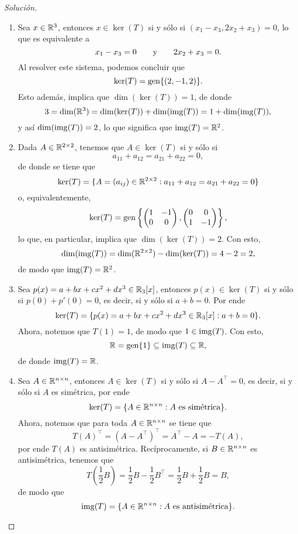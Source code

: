\documentclass[a4,11pt]{aleph-notas}
\begin{document}
\begin{proof}[Solución]\hspace{0pt}
\begin{enumerate}
    \item Sea $x\in\mathbb{R}^3$, entonces $x\in\ker(T)$ si y sólo si $(x_1-x_3,2x_2+x_3) = 0$, lo que es equivalente a 
    \[
        x_1 - x_3 = 0 \qquad\text{y}\qquad 2x_2 + x_3 = 0.
    \]
    Al resolver este sistema, podemos concluir que
    \[
        \ker(T) = \operatorname{gen}\{(2,-1,2)\}.
    \]
    Esto además, implica que $\dim(\ker(T)) = 1$, de donde
    \[
        3 = \dim(\mathbb{R}^3) = \dim(\ker(T)) + \dim(\operatorname{img}(T)) = 1 + \dim(\operatorname{img}(T)),
    \]
    y así $\dim(\operatorname{img}(T)) = 2$, lo que significa que $\operatorname{img}(T)=\mathbb{R}^2$.
    
    \item Dada $A\in\mathbb{R}^{2\times 2}$, tenemos que $A\in\ker(T)$ si y sólo si 
    \[
        a_{11}+a_{12} = a_{21} + a_{22} = 0,
    \]
    de donde se tiene que
    \[
        \ker(T) = \{A=(a_{ij})\in\mathbb{R}^{2\times 2} :  a_{11}+a_{12} = a_{21} + a_{22} = 0\}
    \]
    o, equivalentemente,
    \[
        \ker(T) = \operatorname{gen}\left\{ \begin{pmatrix}
                    1 & -1 \\ 0 & 0
        \end{pmatrix}, \begin{pmatrix}
                    0 & 0 \\ 1 & -1
        \end{pmatrix} \right\},
    \]
    lo que, en particular, implica que $\dim(\ker(T)) = 2$. Con esto,
    \[
        \dim(\operatorname{img}(T)) = \dim(\mathbb{R}^{2\times 2}) - \dim(\ker(T)) = 4 - 2 = 2,
    \]
    de modo que $\operatorname{img}(T) = \mathbb{R}^2$.
    
    \item Sea $p(x)=a+bx+cx^2+dx^3\in\mathbb{R}_3[x]$, entonces $p(x)\in \ker(T)$ si y sólo si $p(0)+p'(0)=0$, es decir, si y sólo si $a+b=0$. Por ende
    \[
        \ker(T) = \{ p(x)=a+bx+cx^2+dx^3\in\mathbb{R}_3[x] : a+b = 0 \}.
    \]
    Ahora, notemos que $T(1) = 1$, de modo que $1\in\operatorname{img}(T)$. Con esto,
    \[
        \mathbb{R} = \operatorname{gen}\{1\}\subseteq \operatorname{img}(T) \subseteq\mathbb{R},
    \]
    de donde $\operatorname{img}(T) = \mathbb{R}$.
    
    \item Sea $A\in\mathbb{R}^{n\times n}$, entonces $A\in\ker(T)$ si y sólo si $A-A^\intercal = 0$, es decir, si y sólo si $A$ es simétrica, por ende
    \[
        \ker(T) = \{A\in\mathbb{R}^{n\times n} : A\text{ es simétrica}\}.
    \]
    Ahora, notemos que para toda $A\in\mathbb{R}^{n\times n}$ se tiene que
    \[
        T(A)^\intercal = (A-A^\intercal)^{\intercal} = A^\intercal - A = -T(A),
    \]
    por ende $T(A)$ es antisimétrica. Recíprocamente, si $B\in\mathbb{R}^{n\times n} $ es antisimétrica, tenemos que
    \[
        T\left( \frac{1}{2}B \right) =  \frac{1}{2}B -  \frac{1}{2}B^\intercal =  \frac{1}{2}B +  \frac{1}{2}B = B,
    \]
    de modo que 
    \[
        \operatorname{img}(T) = \{A\in\mathbb{R}^{n\times n} : A \text{ es antisimétrica}\}.
    \]  
    

\end{enumerate}
\end{proof}
\end{document}
